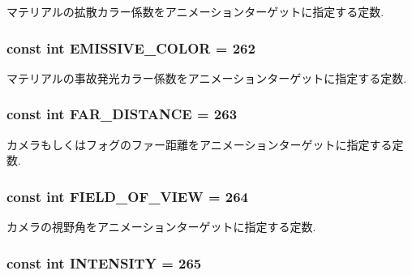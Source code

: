 マテリアルの拡散カラー係数をアニメーションターゲットに指定する定数. \hypertarget{classm3g_1_1AnimationTrack_893461d45d084e5db05b159068f945d0}{
\subsubsection[{EMISSIVE\_\-COLOR}]{\setlength{\rightskip}{0pt plus 5cm}const int {\bf EMISSIVE\_\-COLOR} = 262}}
\label{classm3g_1_1AnimationTrack_893461d45d084e5db05b159068f945d0}


マテリアルの事故発光カラー係数をアニメーションターゲットに指定する定数. \hypertarget{classm3g_1_1AnimationTrack_86457ec0a2799f1f2d7ea8173a644de8}{
\subsubsection[{FAR\_\-DISTANCE}]{\setlength{\rightskip}{0pt plus 5cm}const int {\bf FAR\_\-DISTANCE} = 263}}
\label{classm3g_1_1AnimationTrack_86457ec0a2799f1f2d7ea8173a644de8}


カメラもしくはフォグのファー距離をアニメーションターゲットに指定する定数. \hypertarget{classm3g_1_1AnimationTrack_94c1c1d2f7d48b52e3c2bcd332ed3937}{
\subsubsection[{FIELD\_\-OF\_\-VIEW}]{\setlength{\rightskip}{0pt plus 5cm}const int {\bf FIELD\_\-OF\_\-VIEW} = 264}}
\label{classm3g_1_1AnimationTrack_94c1c1d2f7d48b52e3c2bcd332ed3937}


カメラの視野角をアニメーションターゲットに指定する定数. \hypertarget{classm3g_1_1AnimationTrack_369fe8830f39fe4aec819a371a6c9904}{
\subsubsection[{INTENSITY}]{\setlength{\rightskip}{0pt plus 5cm}const int {\bf INTENSITY} = 265}}
\label{classm3g_1_1AnimationTrack_369fe8830f39fe4aec819a371a6c9904}


